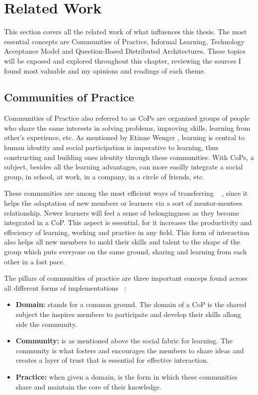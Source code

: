 \chapter{Related Work}
\label{cha:relatedwork}

This section covers all the related work of what influences this thesis.
The most essential concepts are Communities of Practice, Informal Learning, 
Technology Acceptance Model 
and Question-Based Distributed Architectures.
These topics will be exposed and explored throughout this chapter, 
reviewing the sources I found most valuable and my opinions and 
readings of each theme.


\section{Communities of Practice}
\label{section:cops}

Communities of Practice also referred to as CoPs are organized groups of people 
who share the same interests in solving problems, improving skills, learning 
from other's experience, etc. As mentioned by Etinne Wenger \cite{wenger_2002},
learning is central to human identity and social participation is imperative to
learning, thus constructing and building ones identity through these communities.
With CoPs, a subject, besides all the learning advantages, can more easilly integrate
a social group, in school, at work, in a company, in a circle of friends, etc.

These communities are among the most efficient ways of transferring 
~ \cite{goffin_koners_2011}, since it helps the 
adaptation of new members or learners via a sort of mentor-mentees relationship.
Newer learners will feel a sense of belongingness as they become integrated in 
a CoP. This aspect is essential, for it increases the productivity and effeciency 
of learning, working and practice in any field. This form of interaction also 
helps all new members to mold their skills and talent to the shape of the group which
puts everyone on the same ground, sharing and learning from each other in a fast
pace. ~\cite{wengercop}

The pillars of communities of practice are three important conceps found across all
different forms of implementations ~\cite{placeofcopinkm}:

\begin{itemize}
    \item \textbf{Domain:} stands for a common ground. The domain of a CoP is the 
        shared subject the inspires members to participate and develop their skills
        allong side the community.
    \item \textbf{Community:} is as mentioned above the social fabric for learning.
        The community is what fosters and encourages the members to share ideas 
        and creates a layer of trust that is essential for effective interaction.
    \item \textbf{Practice:} when given a domain, is the form in which these 
        communities share and maintain the core of their knowledge.
\end{itemize}

